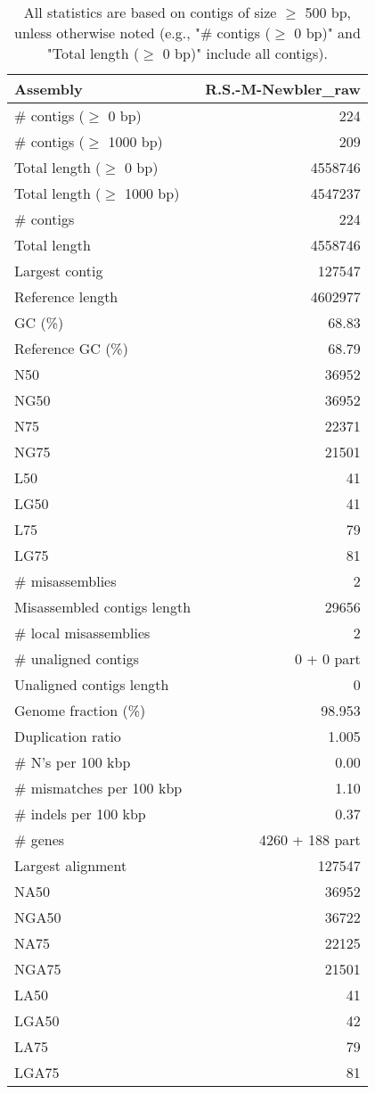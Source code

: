 \documentclass[12pt,a4paper]{article}
\begin{document}
\begin{table}[ht]
\begin{center}
\caption{All statistics are based on contigs of size $\geq$ 500 bp, unless otherwise noted (e.g., "\# contigs ($\geq$ 0 bp)" and "Total length ($\geq$ 0 bp)" include all contigs).}
\begin{tabular}{|l*{1}{|r}|}
\hline
Assembly & R.S.-M-Newbler\_raw \\ \hline
\# contigs ($\geq$ 0 bp) & 224 \\ \hline
\# contigs ($\geq$ 1000 bp) & 209 \\ \hline
Total length ($\geq$ 0 bp) & 4558746 \\ \hline
Total length ($\geq$ 1000 bp) & 4547237 \\ \hline
\# contigs & 224 \\ \hline
Total length & 4558746 \\ \hline
Largest contig & 127547 \\ \hline
Reference length & 4602977 \\ \hline
GC (\%) & 68.83 \\ \hline
Reference GC (\%) & 68.79 \\ \hline
N50 & 36952 \\ \hline
NG50 & 36952 \\ \hline
N75 & 22371 \\ \hline
NG75 & 21501 \\ \hline
L50 & 41 \\ \hline
LG50 & 41 \\ \hline
L75 & 79 \\ \hline
LG75 & 81 \\ \hline
\# misassemblies & 2 \\ \hline
Misassembled contigs length & 29656 \\ \hline
\# local misassemblies & 2 \\ \hline
\# unaligned contigs & 0 + 0 part \\ \hline
Unaligned contigs length & 0 \\ \hline
Genome fraction (\%) & 98.953 \\ \hline
Duplication ratio & 1.005 \\ \hline
\# N's per 100 kbp & 0.00 \\ \hline
\# mismatches per 100 kbp & 1.10 \\ \hline
\# indels per 100 kbp & 0.37 \\ \hline
\# genes & 4260 + 188 part \\ \hline
Largest alignment & 127547 \\ \hline
NA50 & 36952 \\ \hline
NGA50 & 36722 \\ \hline
NA75 & 22125 \\ \hline
NGA75 & 21501 \\ \hline
LA50 & 41 \\ \hline
LGA50 & 42 \\ \hline
LA75 & 79 \\ \hline
LGA75 & 81 \\ \hline
\end{tabular}
\end{center}
\end{table}
\end{document}
